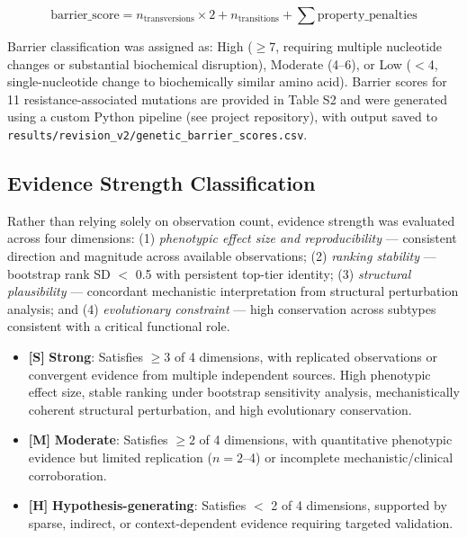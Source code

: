 \documentclass[12pt,a4paper]{article}
\newcommand{\claimlabel}[1]{\textbf{[#1]}}
\begin{document}
\begin{equation}
\text{barrier\_score} = n_{\text{transversions}} \times 2 + n_{\text{transitions}} + \sum \text{property\_penalties}
\end{equation}

Barrier classification was assigned as: High ($\geq$7, requiring multiple nucleotide changes or substantial biochemical disruption), Moderate (4--6), or Low ($<$4, single-nucleotide change to biochemically similar amino acid). Barrier scores for 11 resistance-associated mutations are provided in Table S2 and were generated using a custom Python pipeline (see project repository), with output saved to \texttt{results/revision\_v2/genetic\_barrier\_scores.csv}.

\subsection{Evidence Strength Classification}

Rather than relying solely on observation count, evidence strength was evaluated across four dimensions: (1) \textit{phenotypic effect size and reproducibility} — consistent direction and magnitude across available observations; (2) \textit{ranking stability} — bootstrap rank SD $<$ 0.5 with persistent top-tier identity; (3) \textit{structural plausibility} — concordant mechanistic interpretation from structural perturbation analysis; and (4) \textit{evolutionary constraint} — high conservation across subtypes consistent with a critical functional role.

\begin{itemize}
  \item \claimlabel{S} \textbf{Strong}: Satisfies $\geq 3$ of 4 dimensions, with replicated observations or convergent evidence from multiple independent sources. High phenotypic effect size, stable ranking under bootstrap sensitivity analysis, mechanistically coherent structural perturbation, and high evolutionary conservation.

  \item \claimlabel{M} \textbf{Moderate}: Satisfies $\geq 2$ of 4 dimensions, with quantitative phenotypic evidence but limited replication ($n=2$--4) or incomplete mechanistic/clinical corroboration.

  \item \claimlabel{H} \textbf{Hypothesis-generating}: Satisfies $<$ 2 of 4 dimensions, supported by sparse, indirect, or context-dependent evidence requiring targeted validation.
\end{itemize}
\end{document}

